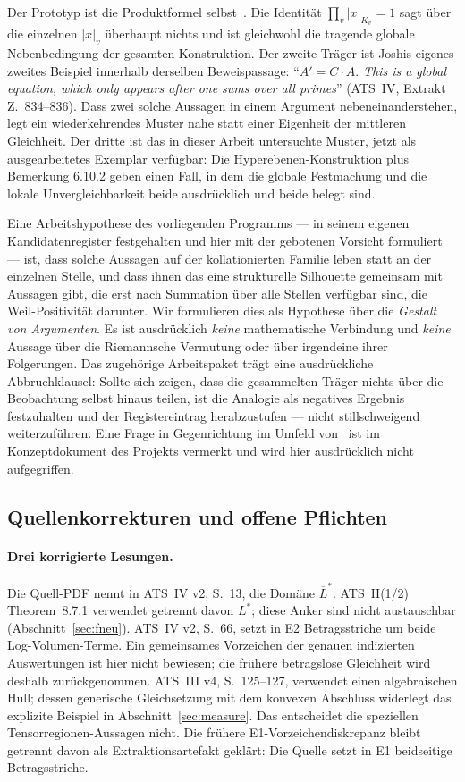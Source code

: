 \documentclass[11pt,a4paper]{article}
\theoremstyle{definition}
\theoremstyle{plain}
\theoremstyle{definition}
\newcommand{\anchor}[2]{(#1, Extrakt Z.~#2)}
\begin{document}
Der Prototyp ist die Produktformel selbst~\cite{ArtinWhaples1945}. Die Identität
$\prod_v |x|_{K_v} = 1$ sagt über die einzelnen $|x|_v$ überhaupt nichts und ist
gleichwohl die tragende globale Nebenbedingung der gesamten Konstruktion. Der zweite
Träger ist Joshis eigenes zweites Beispiel innerhalb derselben Beweispassage:
``$A' = C \cdot A$. \emph{This is a global equation, which only appears after one
sums over all primes}'' \anchor{ATS~IV}{834--836}. Dass zwei solche Aussagen in einem
Argument nebeneinanderstehen, legt ein wiederkehrendes Muster nahe statt einer
Eigenheit der mittleren Gleichheit. Der dritte ist das in dieser Arbeit untersuchte
Muster, jetzt als ausgearbeitetes Exemplar verfügbar: Die Hyperebenen-Konstruktion
plus Bemerkung 6.10.2 geben einen Fall, in dem die globale Festmachung und die lokale
Unvergleichbarkeit beide ausdrücklich und beide belegt sind.

Eine Arbeitshypothese des vorliegenden Programms --- in seinem eigenen
Kandidatenregister festgehalten und hier mit der gebotenen Vorsicht formuliert ---
ist, dass solche Aussagen auf der kollationierten Familie leben statt an der
einzelnen Stelle, und dass ihnen das eine strukturelle Silhouette gemeinsam mit
Aussagen gibt, die erst nach Summation über alle Stellen verfügbar sind, die
Weil-Positivität darunter. Wir formulieren dies als Hypothese über die \emph{Gestalt
von Argumenten}. Es ist ausdrücklich \emph{keine} mathematische Verbindung und
\emph{keine} Aussage über die Riemannsche Vermutung oder über irgendeine ihrer
Folgerungen. Das zugehörige Arbeitspaket trägt eine ausdrückliche Abbruchklausel:
Sollte sich zeigen, dass die gesammelten Träger nichts über die Beobachtung selbst
hinaus teilen, ist die Analogie als negatives Ergebnis festzuhalten und der
Registereintrag herabzustufen --- nicht stillschweigend weiterzuführen. Eine Frage
in Gegenrichtung im Umfeld von~\cite{GranvilleStark2000} ist im Konzeptdokument des
Projekts vermerkt und wird hier ausdrücklich nicht aufgegriffen.

\subsection{Quellenkorrekturen und offene Pflichten}
\label{sec:residues}

\paragraph{Drei korrigierte Lesungen.}
Die Quell-PDF nennt in ATS~IV v2, S.~13, die Domäne $\overline L^*$.
ATS~II(1/2) Theorem~8.7.1 verwendet getrennt davon $L^*$;
diese Anker sind nicht austauschbar (Abschnitt~\ref{sec:fneu}).
ATS~IV v2, S.~66, setzt in E2 Betragsstriche um beide Log-Volumen-Terme.
Ein gemeinsames Vorzeichen der genauen indizierten Auswertungen ist hier
nicht bewiesen; die frühere betragslose Gleichheit wird deshalb zurückgenommen.
ATS~III v4, S.~125--127, verwendet einen algebraischen Hull;
dessen generische Gleichsetzung mit dem konvexen Abschluss widerlegt
das explizite Beispiel in Abschnitt~\ref{sec:measure}.
Das entscheidet die speziellen Tensorregionen-Aussagen nicht.
Die frühere E1-Vorzeichendiskrepanz bleibt getrennt davon als
Extraktionsartefakt geklärt: Die Quelle setzt in E1 beidseitige Betragsstriche.
\end{document}
